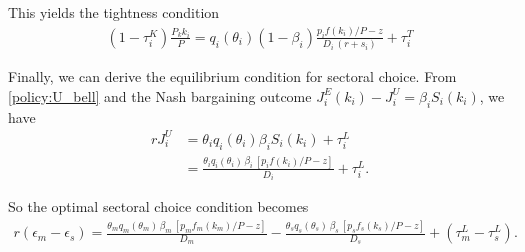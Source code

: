 \documentclass[12pt]{article} %
\newtheorem{proposition}{Proposition}
\theoremstyle{definition}
\begin{document}
This yields the tightness condition 
\begin{align}\label{DE_policy_profit}
    (1-\tau^K_i)\frac{P_kk_i}{P} = q_i(\theta_i)(1-\beta_i) \frac{p_i f(k_i)/P-z}{D_i \,(r+s_i)} + \tau^T_i
\end{align}

Finally, we can derive the equilibrium condition for sectoral choice. From \eqref{policy:U_bell} and the Nash bargaining outcome $J_i^E(k_i)-J_i^U = \beta_i S_i(k_i)$, we have
\begin{align*}
r J_i^U &= \theta_iq_i(\theta_i)\beta_iS_i(k_i)  + \tau^L_i \\
&= \frac{ \theta_i q_i(\theta_i)\,\beta_i\, [p_i f(k_i)/P-z] }
       {D_i } +\tau^L_i.
\label{policy:JU_final_0}
\end{align*}

So the optimal sectoral choice condition becomes
\begin{align}\label{DE_policy_Ls}
    r(\epsilon_m-\epsilon_s) = \frac{ \theta_m q_m(\theta_m)\,\beta_m\, [p_m f_m(k_m)/P-z] }{D_m }- \frac{ \theta_s q_s(\theta_s)\,\beta_s\, [p_s f_s(k_s)/P-z] }
       {D_s } +(\tau^L_m-\tau_s^L).
\end{align}




\end{document}

